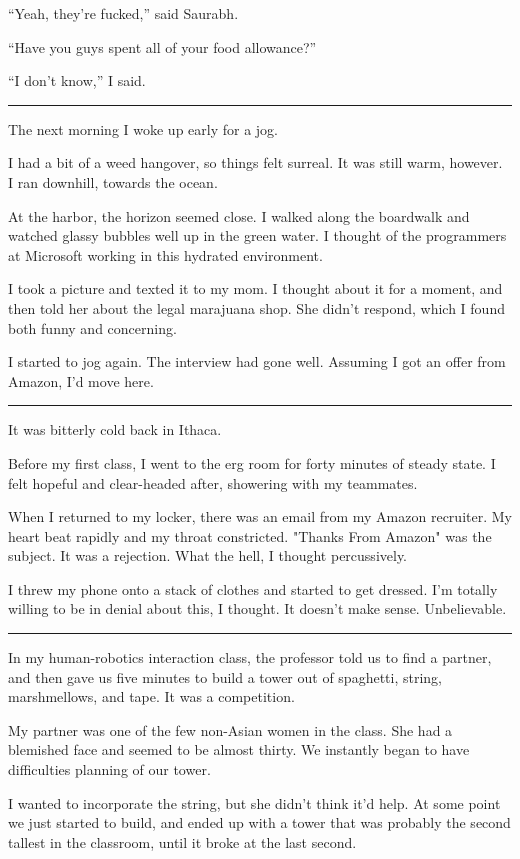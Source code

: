 ``Yeah, they're fucked,'' said Saurabh.  

``Have you guys spent all of your food allowance?''

``I don't know,'' I said.

\plainfancybreak{12pt}{2}{* * *}

The next morning I woke up early for a jog.

I had a bit of a weed hangover, so things felt surreal.  It was still warm,
however.  I ran downhill, towards the ocean.

At the harbor, the horizon seemed close.  I walked along the boardwalk and
watched glassy bubbles well up in the green water.  I thought of the programmers
at Microsoft working in this hydrated environment. 

I took a picture and texted it to my mom.  I thought about it for a moment, and
then told her about the legal marajuana shop.  She didn't respond, which I found
both funny and concerning. 

I started to jog again.  The interview had gone well.  Assuming I got an
offer from Amazon, I'd move here. 

\plainfancybreak{12pt}{2}{* * *}

It was bitterly cold back in Ithaca.

Before my first class, I went to the erg room for forty minutes of steady state.
I felt hopeful and clear-headed after, showering with my teammates.

When I returned to my locker, there was an email from my Amazon recruiter.  My
heart beat rapidly and my throat constricted.  "Thanks From Amazon" was the
subject.  It was a rejection.  What the hell, I thought percussively. 

I threw my phone onto a stack of clothes and started to get dressed.  I'm
totally willing to be in denial about this, I thought.  It doesn't make sense.
Unbelievable. 

\plainfancybreak{12pt}{2}{* * *}

In my human-robotics interaction class, the professor told us to find a partner,
and then gave us five minutes to build a tower out of spaghetti, string,
marshmellows, and tape.  It was a competition.

My partner was one of the few non-Asian women in the class.  She had a blemished
face and seemed to be almost thirty.  We instantly began to have difficulties
planning of our tower.  

I wanted to incorporate the string, but she didn't think it'd help.  At some
point we just started to build, and ended up with a tower that was probably the
second tallest in the classroom, until it broke at the last second.

